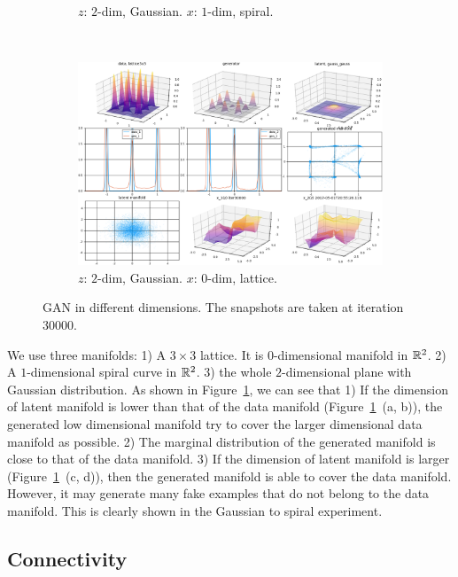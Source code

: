 \begin{figure}[ht]
\begin{subfigure}[t]{0.45\textwidth}
        \caption{$z$: $2$-dim, Gaussian.
            $x$: $1$-dim, spiral.}
    \end{subfigure}
    ~
    \begin{subfigure}[t]{0.45\textwidth}
        \includegraphics[width=\linewidth]{"fig/gaussgauss_lattice3x3_00030000"}
        \caption{$z$: $2$-dim, Gaussian.
            $x$: $0$-dim, lattice.}
    \end{subfigure}
    \caption{\small
        GAN in different dimensions.
        The snapshots are taken at iteration $30000$.
        }
    \label{fig:dim}
\end{figure}

We use three manifolds:
1) A $3\times3$ lattice. It is $0$-dimensional manifold in ${\mathbb{R}}^2$.
2) A $1$-dimensional spiral curve in ${\mathbb{R}}^2$.
3) the whole $2$-dimensional plane with Gaussian distribution.
As shown in Figure~\ref{fig:dim},
we can see that
1) If the dimension of latent manifold is lower than that of the data manifold
(Figure~\ref{fig:dim}~(a, b)),
the generated low dimensional manifold try to cover the
larger dimensional data manifold as possible.
2) The marginal distribution of the generated manifold is close to that
of the data manifold.
3) If the dimension of latent manifold is larger (Figure~\ref{fig:dim}~(c, d)),
then the generated manifold is able to cover the data manifold.
However,
it may generate many fake examples that do not belong to the data manifold.
This is clearly shown in the Gaussian to spiral experiment.

\subsection{Connectivity}

